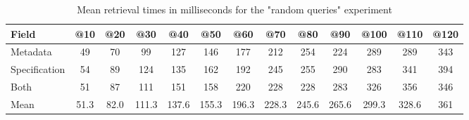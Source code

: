 \begin{table}[!h]
    \begin{center}
        \begin{tabular}{l c c c c c c c c c c c c}
            \hline
            \textbf{Field} & \textbf{@10} & \textbf{@20} & \textbf{@30} & \textbf{@40} & \textbf{@50} & \textbf{@60} & \textbf{@70} & \textbf{@80} & \textbf{@90} & \textbf{@100} & \textbf{@110} & \textbf{@120} \\ \hline
            Metadata & 49 & 70 & 99 & 127 & 146 & 177 & 212 & 254 & 224 & 289 & 289 & 343 \\
            Specification & 54 & 89 & 124 & 135 & 162 & 192 & 245 & 255 & 290 & 283 & 341 & 394 \\
            Both & 51 & 87 & 111 & 151 & 158 & 220 & 228 & 228 & 283 & 326 & 356 & 346 \\ \hline \hline
            Mean & 51.3 & 82.0 & 111.3 & 137.6 & 155.3 & 196.3 & 228.3 & 245.6 & 265.6 & 299.3 & 328.6 & 361 \\ \hline
        \end{tabular}
    \end{center}

    \caption{Mean retrieval times in milliseconds for the "random queries" experiment}
    \label{tab:times-queries}
\end{table}

